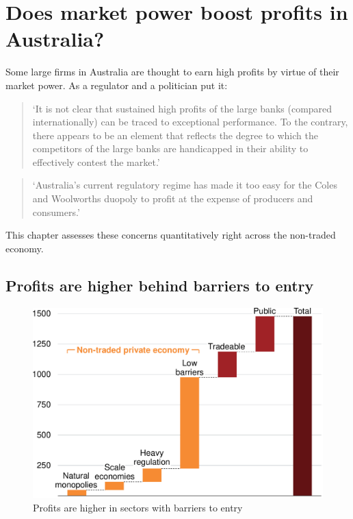 \chapter{Does market power boost profits in Australia?\label{chap:profits}}

Some large firms in Australia are thought to earn high profits by virtue of their market power. As a regulator and a politician put it:

\begin{quote}
    `It is not clear that sustained high profits of the large banks (compared internationally) can be traced to exceptional performance. To the contrary, there appears to be an element that reflects the degree to which the competitors of the large banks are handicapped in their ability to effectively contest the market.'
    
\end{quote}


\begin{quote}
    `Australia’s current regulatory regime has made it too easy for the Coles and Woolworths duopoly to profit at the expense of producers and consumers.'
    
\end{quote}

This chapter assesses these concerns quantitatively right across the non-traded economy.

\section{Profits are higher behind barriers to entry}

\begin{figure}
    \caption{Profits are higher in sectors with barriers to entry \label{fig:ROE-by-barriers}}
  \includegraphics[page=18]{atlas/Charts} 
\end{figure}

